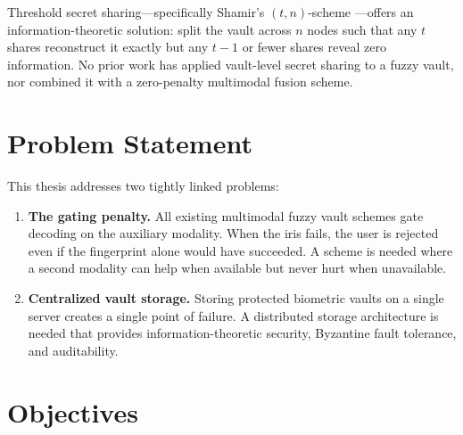 Threshold secret sharing---specifically Shamir's $(t,n)$-scheme
\cite{shamir1979how}---offers an information-theoretic solution: split the vault
across $n$ nodes such that any $t$ shares reconstruct it exactly but any
$t{-}1$ or fewer shares reveal zero information. No prior work has applied
vault-level secret sharing to a fuzzy vault, nor combined it with a zero-penalty
multimodal fusion scheme.

\section{Problem Statement}

This thesis addresses two tightly linked problems:

\begin{enumerate}
  \item \textbf{The gating penalty.} All existing multimodal fuzzy vault schemes
  gate decoding on the auxiliary modality. When the iris fails, the user is
  rejected even if the fingerprint alone would have succeeded. A scheme is needed
  where a second modality can help when available but never hurt when unavailable.

  \item \textbf{Centralized vault storage.} Storing protected biometric vaults on
  a single server creates a single point of failure. A distributed storage
  architecture is needed that provides information-theoretic security,
  Byzantine fault tolerance, and auditability.
\end{enumerate}

\section{Objectives}

